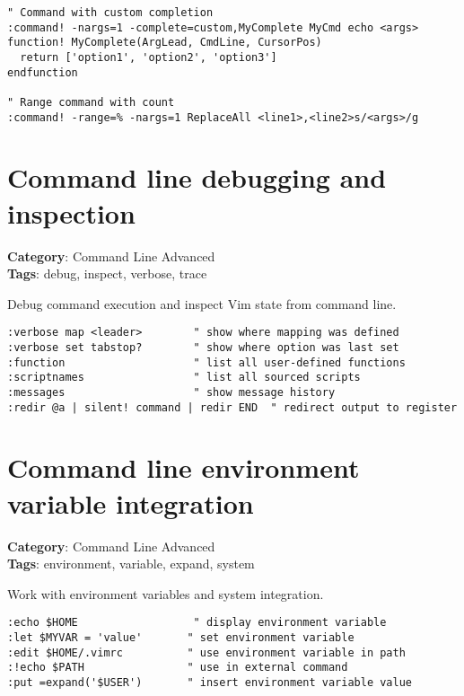 {{{\begin{Exa*}{}
\begin{Verbatim}[fontsize=\footnotesize, breaklines, breakanywhere]
" Command with custom completion
:command! -nargs=1 -complete=custom,MyComplete MyCmd echo <args>
function! MyComplete(ArgLead, CmdLine, CursorPos)
  return ['option1', 'option2', 'option3']
endfunction

" Range command with count
:command! -range=% -nargs=1 ReplaceAll <line1>,<line2>s/<args>/g
\end{Verbatim}
\end{Exa*}

\section{Command line debugging and inspection}

\textbf{Category}: Command Line Advanced\\ \textbf{Tags}: debug, inspect, verbose, trace
\vspace{0.5cm}

Debug command execution and inspect Vim state from command line.

\begin{Exa*}{}
\begin{Verbatim}[fontsize=\footnotesize, breaklines, breakanywhere]
:verbose map <leader>        " show where mapping was defined
:verbose set tabstop?        " show where option was last set
:function                    " list all user-defined functions
:scriptnames                 " list all sourced scripts
:messages                    " show message history
:redir @a | silent! command | redir END  " redirect output to register
\end{Verbatim}
\end{Exa*}

\section{Command line environment variable integration}

\textbf{Category}: Command Line Advanced\\ \textbf{Tags}: environment, variable, expand, system
\vspace{0.5cm}

Work with environment variables and system integration.

\begin{Exa*}{}
\begin{Verbatim}[fontsize=\footnotesize, breaklines, breakanywhere]
:echo $HOME                  " display environment variable
:let $MYVAR = 'value'       " set environment variable
:edit $HOME/.vimrc          " use environment variable in path
:!echo $PATH                " use in external command
:put =expand('$USER')       " insert environment variable value
\end{Verbatim}
\end{Exa*}

}}}
